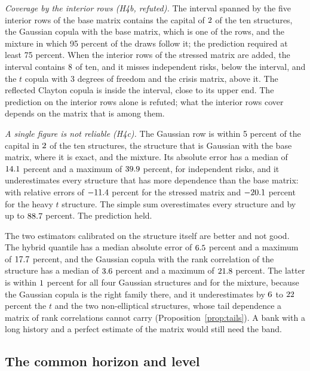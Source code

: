 \emph{Coverage by the interior rows (H4b, refuted).} The interval spanned by the five interior rows of the base matrix contains the
capital of $2$ of the ten structures, the Gaussian copula with the base matrix, which is one of the rows, and the mixture
in which 95 percent of the draws follow it; the prediction required at least 75 percent. When the interior rows of the stressed
matrix are added, the interval contains $8$ of ten, and it misses independent risks, below the interval, and
the $t$ copula with 3 degrees of freedom and the crisis matrix, above it. The reflected Clayton copula is inside the interval, close to its upper end. The prediction on the interior rows alone is refuted; what the
interior rows cover depends on the matrix that is among them.

\emph{A single figure is not reliable (H4c).} The Gaussian row is within 5 percent of the capital in $2$ of the ten
structures, the structure that is Gaussian with the base matrix, where it is exact, and the mixture. Its absolute error has a median
of $14.1$ percent and a maximum of $39.9$ percent, for independent risks, and it underestimates every structure that
has more dependence than the base matrix: with relative errors of $-11.4$ percent for the stressed matrix and
$-20.1$ percent for the heavy $t$ structure. The simple sum overestimates every structure and by up to
$88.7$ percent. The prediction held.

The two estimators calibrated on the structure itself are better and not good. The hybrid quantile has a median absolute error of
$6.5$ percent and a maximum of $17.7$ percent, and the Gaussian copula with the rank correlation of the
structure has a median of $3.6$ percent and a maximum of $21.8$ percent. The latter is within $1$ percent for
all four Gaussian structures and for the mixture, because the Gaussian copula is the right family there, and it underestimates by $6$
to $22$ percent the $t$ and the two non-elliptical structures, whose tail dependence a matrix of rank correlations cannot carry
(Proposition~\ref{prop:tails}). A bank with a long history and a perfect estimate of the matrix would still need the band.

\subsection{The common horizon and level}
\label{sec:results-level}

